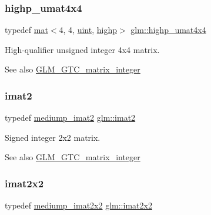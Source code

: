 \subsubsection{\texorpdfstring{highp\+\_\+umat4x4}{highp\_umat4x4}}
{\footnotesize\ttfamily typedef \mbox{\hyperlink{structglm_1_1mat}{mat}}$<$4, 4, \mbox{\hyperlink{group__core__precision_ga4fd29415871152bfb5abd588334147c8}{uint}}, \mbox{\hyperlink{namespaceglm_a36ed105b07c7746804d7fdc7cc90ff25ac6f7eab42eacbb10d59a58e95e362074}{highp}}$>$ \mbox{\hyperlink{group__gtc__matrix__integer_gada50011594ccf358c9eafe49ff07999f}{glm\+::highp\+\_\+umat4x4}}}

High-\/qualifier unsigned integer 4x4 matrix. \begin{DoxySeeAlso}{See also}
\mbox{\hyperlink{group__gtc__matrix__integer}{G\+L\+M\+\_\+\+G\+T\+C\+\_\+matrix\+\_\+integer}} 
\end{DoxySeeAlso}
\mbox{\label{group__gtc__matrix__integer_ga77a581b3366fb63fc72f8f20830003e0}} 
\subsubsection{\texorpdfstring{imat2}{imat2}}
{\footnotesize\ttfamily typedef \mbox{\hyperlink{group__gtc__matrix__integer_ga74e065ab9524e6b7bd5a84cffb758e71}{mediump\+\_\+imat2}} \mbox{\hyperlink{group__gtc__matrix__integer_ga77a581b3366fb63fc72f8f20830003e0}{glm\+::imat2}}}

Signed integer 2x2 matrix. \begin{DoxySeeAlso}{See also}
\mbox{\hyperlink{group__gtc__matrix__integer}{G\+L\+M\+\_\+\+G\+T\+C\+\_\+matrix\+\_\+integer}} 
\end{DoxySeeAlso}
\mbox{\label{group__gtc__matrix__integer_gaf7f44f44d966377666d41ed059524732}} 
\subsubsection{\texorpdfstring{imat2x2}{imat2x2}}
{\footnotesize\ttfamily typedef \mbox{\hyperlink{group__gtc__matrix__integer_gafe326375aa42c0abbe571d376f4cbd95}{mediump\+\_\+imat2x2}} \mbox{\hyperlink{group__gtc__matrix__integer_gaf7f44f44d966377666d41ed059524732}{glm\+::imat2x2}}}

